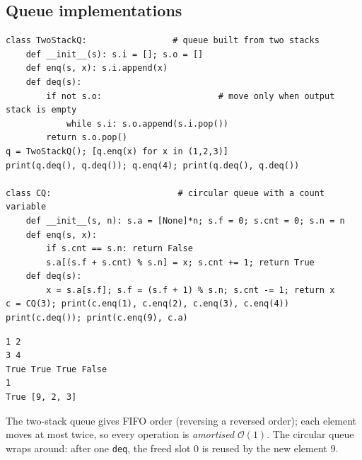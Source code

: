 \documentclass[11pt,a4paper]{article}
\newcommand{\Oh}{\mathcal{O}}
\newcommand{\py}[1]{\texttt{#1}}
\begin{document}
\subsection{Queue implementations}
\begin{lstlisting}
class TwoStackQ:                 # queue built from two stacks
    def __init__(s): s.i = []; s.o = []
    def enq(s, x): s.i.append(x)
    def deq(s):
        if not s.o:                       # move only when output stack is empty
            while s.i: s.o.append(s.i.pop())
        return s.o.pop()
q = TwoStackQ(); [q.enq(x) for x in (1,2,3)]
print(q.deq(), q.deq()); q.enq(4); print(q.deq(), q.deq())

class CQ:                         # circular queue with a count variable
    def __init__(s, n): s.a = [None]*n; s.f = 0; s.cnt = 0; s.n = n
    def enq(s, x):
        if s.cnt == s.n: return False
        s.a[(s.f + s.cnt) % s.n] = x; s.cnt += 1; return True
    def deq(s):
        x = s.a[s.f]; s.f = (s.f + 1) % s.n; s.cnt -= 1; return x
c = CQ(3); print(c.enq(1), c.enq(2), c.enq(3), c.enq(4))
print(c.deq()); print(c.enq(9), c.a)
\end{lstlisting}
\begin{lstlisting}[style=out]
1 2
3 4
True True True False
1
True [9, 2, 3]
\end{lstlisting}
The two-stack queue gives FIFO order (reversing a reversed order); each element moves at most twice, so every operation is \emph{amortised} $\Oh(1)$. The circular queue wraps around: after one \py{deq}, the freed slot $0$ is reused by the new element $9$.
\end{document}

